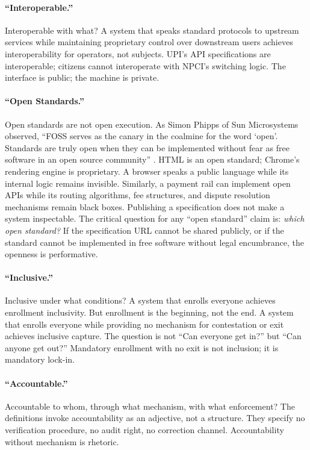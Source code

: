 \documentclass{article}
\begin{document}
\paragraph{``Interoperable.''}  Interoperable with what? A system that speaks standard protocols to upstream services while maintaining proprietary control over downstream users achieves interoperability for operators, not subjects. UPI's API specifications are interoperable; citizens cannot interoperate with NPCI's switching logic. The interface is public; the machine is private.

\paragraph{``Open Standards.''}  Open standards are not open execution. As Simon Phipps of Sun Microsystems observed, ``FOSS serves as the canary in the coalmine for the word `open'. Standards are truly open when they can be implemented without fear as free software in an open source community'' \citep{phipps2007}. HTML is an open standard; Chrome's rendering engine is proprietary. A browser speaks a public language while its internal logic remains invisible. Similarly, a payment rail can implement open APIs while its routing algorithms, fee structures, and dispute resolution mechanisms remain black boxes. Publishing a specification does not make a system inspectable. The critical question for any ``open standard'' claim is: \textit{which open standard?} If the specification URL cannot be shared publicly, or if the standard cannot be implemented in free software without legal encumbrance, the openness is performative.

\paragraph{``Inclusive.''}  Inclusive under what conditions? A system that enrolls everyone achieves enrollment inclusivity. But enrollment is the beginning, not the end. A system that enrolls everyone while providing no mechanism for contestation or exit achieves inclusive capture. The question is not ``Can everyone get in?'' but ``Can anyone get out?'' Mandatory enrollment with no exit is not inclusion; it is mandatory lock-in.

\paragraph{``Accountable.''}  Accountable to whom, through what mechanism, with what enforcement? The definitions invoke accountability as an adjective, not a structure. They specify no verification procedure, no audit right, no correction channel. Accountability without mechanism is rhetoric.
\end{document}
